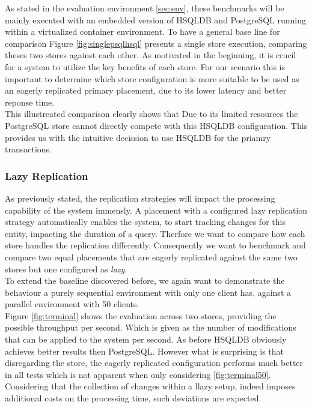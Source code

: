 As stated in the evaluation environment \ref{sec:env}, these benchmarks will be mainly executed with an embedded version of HSQLDB and PostgreSQL running within a virtualized 
container environment. To have a general base line for comparison Figure \ref{fig:singlepsqlhsql} presents a single store execution, comparing theses two stores against each other.
As motivated in the beginning, it is crucil for a system to utilize the key benefits of each store. For our scenario this is important to determine which 
store configuration is more suitable to be used as an eagerly replicated primary placement, due to its lower latency and better reponse time.\\
This illustreated comparison clearly shows that Due to its limited resources the PostgreSQL store cannot directly compete with this HSQLDB configuration.
This provides us with the intuitive decission to use HSQLDB for the priamry transactions.








\subsubsection{Lazy Replication} 


As previously stated, the replication strategies will impact the processing capability of the system immensly.
A placement with a configured lazy replication strategy automatically enables the system, to start tracking changes for this entity, impacting the duration of a query.
Therfore we want to compare how each store handles the replication differently. Consequently we want to benchmark and compare two equal placements that are eagerly replicated
against the same two stores but one configured as \emph{lazy}.\\

To extend the baseline discovered before, we again want to demonstrate the behaviour a purely sequential environment with only one client has, 
against a parallel environment with 50 clients.\\
Figure \ref{fig:terminal} shows the evaluation across two stores, providing the possible throughput per second. Which is given as the number of modifications that can be 
applied to the system per second. As before HSQLDB obviously achieves better results then PostgreSQL. However what is surprising is that disregarding the store,
the eagerly replicated configuration performs much better in all tests which is not apparent when only considering \ref{fig:terminal50}.
Considering that the collection of changes within a llazy setup, indeed imposes additional costs on the processing time, such deviations are expected.

